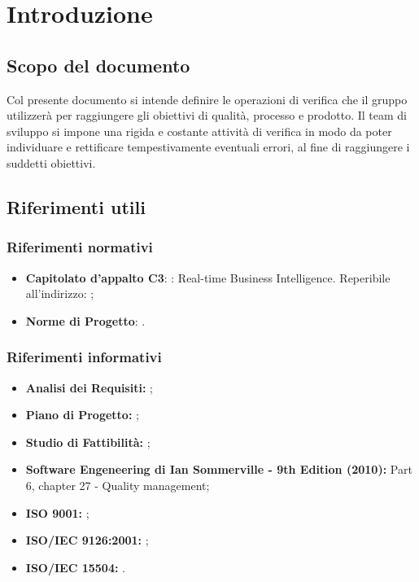 
\section{Introduzione}
	
	\subsection{Scopo del documento}
		Col presente documento si intende definire le operazioni di verifica che il gruppo \groupname{} utilizzerà per raggiungere gli obiettivi di qualità, processo e prodotto. Il team di sviluppo si impone una rigida e costante attività di verifica in modo da poter individuare e rettificare tempestivamente eventuali errori, al fine di raggiungere i suddetti obiettivi. 
	
	

	\subsection{Riferimenti utili}
		

		\subsubsection{Riferimenti normativi}
			\begin{itemize}
				\item \textbf{Capitolato d'appalto C3}: \projectname{}: Real-time Business Intelligence. Reperibile all'indirizzo: ;
				\item \textbf{Norme di Progetto}: .
			\end{itemize}
		

		\subsubsection{Riferimenti informativi}
			\begin{itemize}
				\item \textbf{Analisi dei Requisiti:} ;
				\item \textbf{Piano di Progetto:} ;
				\item \textbf{Studio di Fattibilità:} ;
				\item \textbf{Software Engeneering di Ian Sommerville - 9th Edition (2010):} Part 6, chapter 27 - Quality management;
				\item \textbf{ISO 9001:} ;
				\item \textbf{ISO/IEC 9126:2001:} ;
				\item \textbf{ISO/IEC 15504:} .
			\end{itemize}
